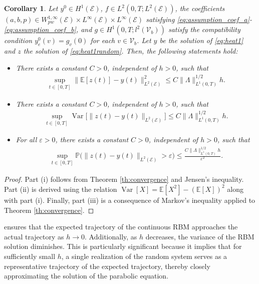 \documentclass[10pt,a4paper]{amsart}
\DeclareMathOperator{\Var}{Var}
\def\to{\rightarrow}
\newtheorem{corollary}{Corollary}[section]
\begin{document}
\begin{corollary}\label{coro:convergence}Let $y^0 \in H^1(\mathcal{E})$, $f \in L^2(0, T; L^2(\mathcal{E}))$, the coefficients $(a, b, p) \in W^{1,\infty}_{pw}(\mathcal{E}) \times L^\infty(\mathcal{E}) \times L^\infty(\mathcal{E})$ satisfying \eqref{eq:assumption_coef_a}-\eqref{eq:assumption_coef_b}, and $g \in H^1(0, T; l^2(\mathcal{V}_b))$ satisfy the compatibility condition $y^0_e(v) = g_v(0)$ for each $v \in \mathcal{V}_b$. Let $y$ be the solution of \eqref{eq:heat1} and $z$ the solution of \eqref{eq:heat1random}. Then, the following statements hold:
    \begin{itemize}
        \item[(i)] There exists a constant $C > 0$, independent of $h > 0$, such that 
        \begin{align*}
            \sup_{t \in [0, T]} \|\mathbb{E}[z(t)] - y(t)\|_{L^2(\mathcal{E})}^2 \leq C \|\Lambda\|_{L^1(0, T)}^{1/2} h.
        \end{align*}
        
        \item[(ii)] There exists a constant $C > 0$, independent of $h > 0$, such that 
        \begin{align*}
            \sup_{t \in [0, T]} \Var\big[\|z(t) - y(t)\|_{L^2(\mathcal{E})}\big] \leq C \|\Lambda\|_{L^1(0, T)}^{1/2} h.
        \end{align*}
        
        \item[(iii)] For all $\varepsilon > 0$, there exists a constant $C > 0$, independent of $h > 0$, such that 
        \begin{align*}
            \sup_{t \in [0, T]}\mathbb{P}\bigg( \|z(t) - y(t)\|_{L^2(\mathcal{E})} > \varepsilon\bigg) \leq \frac{C \|\Lambda\|_{L^1(0, T)}^{1/2} h}{\varepsilon^2}.
        \end{align*}
    \end{itemize}
\end{corollary}

\begin{proof}
    Part (i) follows from Theorem \ref{th:convergence} and Jensen's inequality. Part (ii) is derived using the relation $\Var[X] = \mathbb{E}[X^2] - (\mathbb{E}[X])^2$ along with part (i). Finally, part (iii) is a consequence of Markov's inequality applied to Theorem \ref{th:convergence}.
\end{proof}

 ensures that the expected trajectory of the continuous RBM approaches the actual trajectory as $h \to 0$. Additionally, as $h$ decreases, the variance of the RBM solution diminishes. This is particularly significant because it implies that for sufficiently small $h$, a single realization of the random system serves as a representative trajectory of the expected trajectory, thereby closely approximating the solution of the parabolic equation. 
\end{document}
